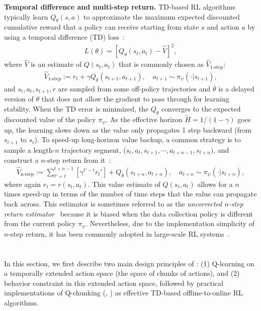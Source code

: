 \textbf{Temporal difference and multi-step return.} TD-based RL algorithms typically learn $Q_\theta(s, a)$ to approximate the maximum expected discounted cumulative reward that a policy can receive starting from state $s$ and action $a$ by using a temporal difference (TD) loss~\citep{sutton1998reinforcement}:
\begin{align}
    L(\theta) = \left[Q_\theta(s_t, a_t) - \hat{V}\right]^2,
\end{align}
where $\hat{V}$ is an estimate of $Q(s_t, a_t)$ that is commonly chosen as $\hat{V}_{\mathrm{1\text{-}step}}$:
\begin{align}
    \hat{V}_{\mathrm{1\text{-}step}} := r_t + \gamma Q_{\bar \theta}(s_{t+1}, a_{t+1}), \quad a_{t+1} \sim \pi_\psi(\cdot| s_{t+1}),
\end{align}
and $s_t, a_t, s_{t+1}, r$ are sampled from some off-policy trajectories and $\bar \theta$ is a delayed version of $\theta$ that does not allow the gradient to pass through for learning stability. When the TD error is minimized, the $Q_\theta$ converges to the expected discounted value of the policy $\pi_\psi$. As the effective horizon $\tilde{H} = 1 / (1-\gamma)$ goes up, the learning slows down as the value only propagates 1 step backward (from $s_{t+1}$ to $s_t$). To speed-up long-horizon value backup, a common strategy is to sample a length-$n$ trajectory segment, ($s_t, a_t, s_{t+1}, \cdots, a_{t+n-1}, s_{t+n})$, and construct a $n$-step return from it~\citep{watkins1989learning, sutton1998reinforcement}:
\begin{align}
    \hat{V}_{\mathrm{n\text{-}step}} := \sum_{t'=t}^{t+n-1} \left[\gamma^{t'-t}r_t'\right] + Q_{\bar \theta}(s_{t+n}, a_{t+n}), \quad a_{t+n} \sim \pi_\psi(\cdot | s_{t+n}),
    \label{eq:nstep}
\end{align}
where again $r_t = r(s_t, a_t)$. This value estimate of $Q(s_t, a_t)$ allows for a $n$ times speed-up in terms of the number of time steps that the value can propagate back across. This estimator is sometimes referred to as the \emph{uncorrected $n$-step return estimator}~\citep{fedus2020revisiting, kozuno2021revisiting} because it is biased when the data collection policy is different from the current policy $\pi_\psi$.
Nevertheless, due to the implementation simplicity of $n$-step return, it has been commonly adopted in large-scale RL systems~\citep{mnih2016asynchronous, hessel2018rainbow, kapturowski2018recurrent, wurman2022outracing}.



\section{\ourslong{}}
\label{sec:method}
In this section, we first describe two main design principles of : (1) Q-learning on a temporally extended action space (the space of chunks of actions), and (2) behavior constraint in this extended action space, followed by practical implementations of Q-chunking (, ) as effective TD-based offline-to-online RL algorithms.

